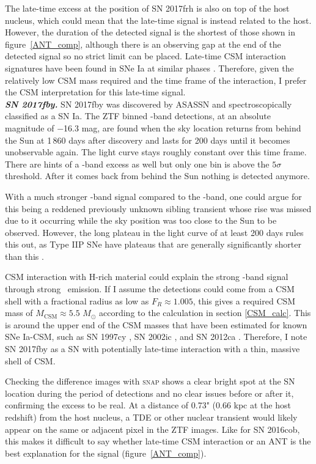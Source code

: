 \documentclass[a4paper,oneside,12pt, class=Latex/Classes/PhDthesisPSnPDF, crop=false]{standalone}
\begin{document}
The late-time excess at the position of SN 2017frh is also on top of the host nucleus, which could mean that the late-time signal is instead related to the host. However, the duration of the detected signal is the shortest of those shown in figure~\ref{ANT_comp}, although there is an observing gap at the end of the detected signal so no strict limit can be placed. Late-time CSM interaction signatures have been found in SNe Ia at similar phases \citep{2015cp}. Therefore, given the relatively low CSM mass required and the time frame of the interaction, I prefer the CSM interpretation for this late-time signal.\\


\textit{\textbf{SN 2017fby.}}
SN 2017fby was discovered by ASASSN and spectroscopically classified as a SN Ia. The ZTF binned \ztfr-band detections, at an absolute magnitude of $-$16.3 mag, are found when the sky location returns from behind the Sun at 1\,860 days after discovery and lasts for 200 days until it becomes unobservable again. The light curve stays roughly constant over this time frame. There are hints of a \ztfg-band excess as well but only one bin is above the $5\sigma$ threshold. After it comes back from behind the Sun nothing is detected anymore.

With a much stronger \ztfr-band signal compared to the \ztfg-band, one could argue for this being a reddened previously unknown sibling transient whose rise was missed due to it occurring while the sky position was too close to the Sun to be observed. However, the long plateau in the light curve of at least 200 days rules this out, as Type IIP SNe have plateaus that are generally significantly shorter than this \citep{IIL_IIP, SN_II_V_band_lcs}.

CSM interaction with H-rich material could explain the strong \ztfr-band signal through strong \Halpha\ emission. If I assume the detections could come from a CSM shell with a fractional radius as low as $F_R \approx 1.005$, this gives a required CSM mass of $M_\text{CSM} \approx 5.5$ $M_\odot$ according to the calculation in section \ref{CSM_calc}. This is around the upper end of the CSM masses that have been estimated for known SNe Ia-CSM, such as SN 1997cy \citep{Chugai_2004}, SN 2002ic \citep{Chugai_2004, Inserra_2016}, and SN 2012ca \citep{Inserra_2016}. Therefore, I note SN 2017fby as a SN with potentially late-time interaction with a thin, massive shell of CSM.

Checking the difference images with \textsc{snap} shows a clear bright spot at the SN location during the period of detections and no clear issues before or after it, confirming the excess to be real. At a distance of 0.73" (0.66 kpc at the host redshift) from the host nucleus, a TDE or other nuclear transient would likely appear on the same or adjacent pixel in the ZTF images. Like for SN 2016cob, this makes it difficult to say whether late-time CSM interaction or an ANT is the best explanation for the signal (figure~\ref{ANT_comp}).\\
\end{document}
